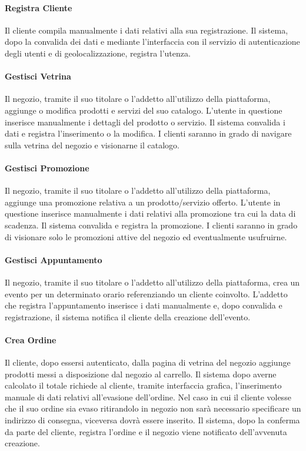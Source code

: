 \paragraph{Registra Cliente} Il cliente compila manualmente i dati relativi alla sua registrazione. Il sistema, dopo la convalida dei dati e mediante l'interfaccia con il servizio di autenticazione degli utenti e di geolocalizzazione, registra l'utenza.
\paragraph{Gestisci Vetrina} Il negozio, tramite il suo titolare o l'addetto all'utilizzo della piattaforma, aggiunge o modifica prodotti e servizi del suo catalogo. L'utente in questione inserisce manualmente i dettagli del prodotto o servizio. Il sistema convalida i dati e registra l'inserimento o la modifica. I clienti saranno in grado di navigare sulla vetrina del negozio e visionarne il catalogo.
\paragraph{Gestisci Promozione} Il negozio, tramite il suo titolare o l'addetto all'utilizzo della piattaforma, aggiunge una promozione relativa a un prodotto/servizio offerto. L'utente in questione inserisce manualmente i dati relativi alla promozione tra cui la data di scadenza. Il sistema convalida e registra la promozione. I clienti saranno in grado di visionare solo le promozioni attive del negozio ed eventualmente usufruirne.
\paragraph{Gestisci Appuntamento} Il negozio, tramite il suo titolare o l'addetto all'utilizzo della piattaforma, crea un evento per un determinato orario referenziando un cliente coinvolto. L'addetto che registra l'appuntamento inserisce i dati manualmente e, dopo convalida e registrazione, il sistema notifica il cliente della creazione dell'evento.
\paragraph{Crea Ordine} Il cliente, dopo essersi autenticato, dalla pagina di vetrina del negozio aggiunge prodotti messi a disposizione dal negozio al carrello. Il sistema dopo averne calcolato il totale richiede al cliente, tramite interfaccia grafica, l'inserimento manuale di dati relativi all'evasione dell'ordine. Nel caso in cui il cliente volesse che il suo ordine sia evaso ritirandolo in negozio non sarà necessario specificare un indirizzo di consegna, viceversa dovrà essere inserito. Il sistema, dopo la conferma da parte del cliente, registra l'ordine e il negozio viene notificato dell'avvenuta creazione.
